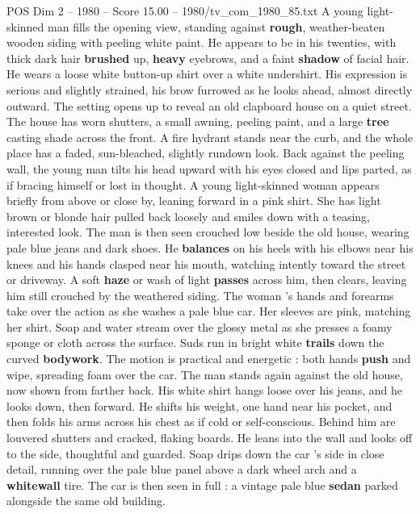 \begin{textsample}{POS Dim 2 – 1980 – Score 15.00 – 1980/tv\_com\_1980\_85.txt}  \label{ex:f2_pos_066}
A young light-skinned man fills the opening view, standing against \textbf{rough}, weather-beaten wooden siding with peeling white paint.
He appears to be in his twenties, with thick dark hair \textbf{brushed} up, \textbf{heavy} eyebrows, and a faint \textbf{shadow} of facial hair.
He wears a loose white button-up shirt over a white undershirt.
His expression is serious and slightly strained, his brow furrowed as he looks ahead, almost directly outward.
The setting opens up to reveal an old clapboard house on a quiet street.
The house has worn shutters, a small awning, peeling paint, and a large \textbf{tree} casting shade across the front.
A fire hydrant stands near the curb, and the whole place has a faded, sun-bleached, slightly rundown look.
Back against the peeling wall, the young man tilts his head upward with his eyes closed and lips parted, as if bracing himself or lost in thought.
A young light-skinned woman appears briefly from above or close by, leaning forward in a pink shirt.
She has light brown or blonde hair pulled back loosely and smiles down with a teasing, interested look.
The man is then seen crouched low beside the old house, wearing pale blue jeans and dark shoes.
He \textbf{balances} on his heels with his elbows near his knees and his hands clasped near his mouth, watching intently toward the street or driveway.
A soft \textbf{haze} or wash of light \textbf{passes} across him, then clears, leaving him still crouched by the weathered siding.
The woman ’s hands and forearms take over the action as she washes a pale blue car.
Her sleeves are pink, matching her shirt.
Soap and water stream over the glossy metal as she presses a foamy sponge or cloth across the surface.
Suds run in bright white \textbf{trails} down the curved \textbf{bodywork}.
The motion is practical and energetic : both hands \textbf{push} and wipe, spreading foam over the car.
The man stands again against the old house, now shown from farther back.
His white shirt hangs loose over his jeans, and he looks down, then forward.
He shifts his weight, one hand near his pocket, and then folds his arms across his chest as if cold or self-conscious.
Behind him are louvered shutters and cracked, flaking boards.
He leans into the wall and looks off to the side, thoughtful and guarded.
Soap drips down the car ’s side in close detail, running over the pale blue panel above a dark wheel arch and a \textbf{whitewall} tire.
The car is then seen in full : a vintage pale blue \textbf{sedan} parked alongside the same old building.

\end{textsample}

